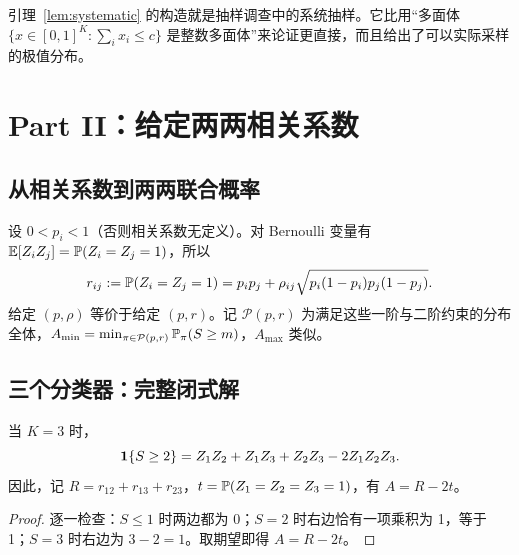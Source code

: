 \documentclass[11pt]{article}
\begin{document}
\begin{remark}
引理~\ref{lem:systematic} 的构造就是抽样调查中的系统抽样。它比用“多面体 $\{x\in[0,1]^K:\sum_ix_i\le c\}$ 是整数多面体”来论证更直接，而且给出了可以实际采样的极值分布。
\end{remark}

\section{Part II：给定两两相关系数}

\subsection{从相关系数到两两联合概率}

设 $0<p_i<1$（否则相关系数无定义）。对 Bernoulli 变量有 $\mathbb{E}[Z_iZ_j]=\mathbb{P}(Z_i=Z_j=1)$，所以
\[
r_{ij}:=\mathbb{P}(Z_i=Z_j=1)=p_ip_j+\rho_{ij}\sqrt{p_i(1-p_i)p_j(1-p_j)} .
\]
给定 $(p,\rho)$ 等价于给定 $(p,r)$。记 $\mathcal P(p,r)$ 为满足这些一阶与二阶约束的分布全体，$A_{\min}=\min_{\pi\in\mathcal P(p,r)}\mathbb{P}_\pi(S\ge m)$，$A_{\max}$ 类似。

\subsection{三个分类器：完整闭式解}

\begin{lemma}[指示函数恒等式]\label{lem:indicator}
当 $K=3$ 时，
\[
\mathbf{1}\{S\ge2\}=Z_1Z_2+Z_1Z_3+Z_2Z_3-2Z_1Z_2Z_3 .
\]
因此，记 $R=r_{12}+r_{13}+r_{23}$，$t=\mathbb{P}(Z_1=Z_2=Z_3=1)$，有 $A=R-2t$。
\end{lemma}
\begin{proof}
逐一检查：$S\le1$ 时两边都为 0；$S=2$ 时右边恰有一项乘积为 1，等于 1；$S=3$ 时右边为 $3-2=1$。取期望即得 $A=R-2t$。
\end{proof}
\end{document}
